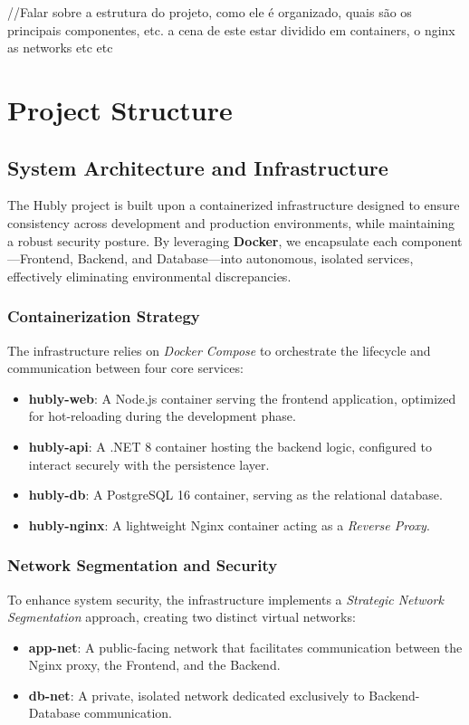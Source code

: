 //Falar sobre a estrutura do projeto, como ele é organizado, quais são os principais componentes, etc. a cena de este estar dividido em containers, o nginx as networks etc etc
\chapter{Project Structure} \label{ch:project_structure}

\section{System Architecture and Infrastructure}

The Hubly project is built upon a containerized infrastructure designed to ensure consistency across development and production environments, while maintaining a robust security posture. By leveraging \textbf{Docker}, we encapsulate each component—Frontend, Backend, and Database—into autonomous, isolated services, effectively eliminating environmental discrepancies.

\subsection{Containerization Strategy}
The infrastructure relies on \textit{Docker Compose} to orchestrate the lifecycle and communication between four core services:
\begin{itemize}
    \item \textbf{hubly-web}: A Node.js container serving the frontend application, optimized for hot-reloading during the development phase.
    \item \textbf{hubly-api}: A .NET 8 container hosting the backend logic, configured to interact securely with the persistence layer.
    \item \textbf{hubly-db}: A PostgreSQL 16 container, serving as the relational database.
    \item \textbf{hubly-nginx}: A lightweight Nginx container acting as a \textit{Reverse Proxy}.
\end{itemize}

\subsection{Network Segmentation and Security}
To enhance system security, the infrastructure implements a \textit{Strategic Network Segmentation} approach, creating two distinct virtual networks:

\begin{itemize}
    \item \textbf{app-net}: A public-facing network that facilitates communication between the Nginx proxy, the Frontend, and the Backend.
    \item \textbf{db-net}: A private, isolated network dedicated exclusively to Backend-Database communication.
\end{itemize}

